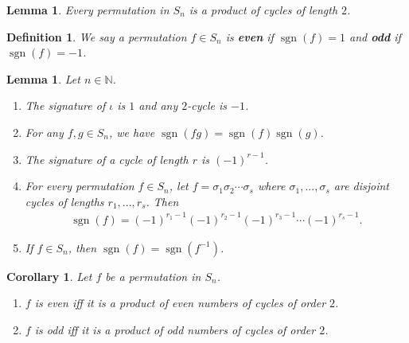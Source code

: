 \documentclass{article}
\theoremstyle{sltheorem}
\newtheorem{definition}{Definition}[section]
\newtheorem{lemma}[theorem]{Lemma}
\newtheorem{corollary}[theorem]{Corollary}
\newcommand{\N}{\mathbb{N}}
\DeclareMathOperator{\sgn}{sgn}
\begin{document}
\begin{lemma}
    Every permutation in $S_n$ is a product of cycles of length $2$.
\end{lemma}
\begin{definition}
    We say a permutation $f\in S_n$ is \textbf{even} if $\sgn(f)=1$ and \textbf{odd} if $\sgn(f) = -1$.
\end{definition}
\begin{lemma}
    Let $n\in\N$.
    \begin{enumerate}
        \item The signature of $\iota$ is $1$ and any $2$-cycle is $-1$.
        \item For any $f,g\in S_n$, we have $\sgn(fg)=\sgn(f)\sgn(g)$.
        \item The signature of a cycle of length $r$ is $(-1)^{r-1}$.
        \item For every permutation $f\in S_n$, let $f=\sigma_1\sigma_2\cdots \sigma_s$ where $\sigma_1,...,\sigma_s$ are disjoint cycles of lengths $r_1,...,r_s$. Then
        \begin{align*}
            \sgn(f)=(-1)^{r_1-1}(-1)^{r_2-1}(-1)^{r_3-1}\cdots(-1)^{r_s-1}.
        \end{align*}
        \item If $f\in S_n$, then $\sgn(f)=\sgn(f^{-1})$.
    \end{enumerate}
\end{lemma}
\begin{corollary}
    Let $f$ be a permutation in $S_n$.
    \begin{enumerate}
        \item $f$ is even iff it is a product of even numbers of cycles of order $2$.
        \item $f$ is odd iff it is a product of odd numbers of cycles of order $2$.
    \end{enumerate}
\end{corollary}
\end{document}

